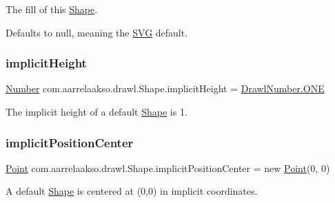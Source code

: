 The fill of this \hyperlink{classcom_1_1aarrelaakso_1_1drawl_1_1_shape}{Shape}. 

Defaults to null, meaning the \hyperlink{classcom_1_1aarrelaakso_1_1drawl_1_1_s_v_g}{S\+VG} default. \mbox{\label{classcom_1_1aarrelaakso_1_1drawl_1_1_shape_a9270317569c41e7f3f3fbe6e71df86e6}} 
\subsubsection{\texorpdfstring{implicit\+Height}{implicitHeight}}
{\footnotesize\ttfamily \hyperlink{interfacecom_1_1aarrelaakso_1_1drawl_1_1_number}{Number} com.\+aarrelaakso.\+drawl.\+Shape.\+implicit\+Height = \hyperlink{classcom_1_1aarrelaakso_1_1drawl_1_1_drawl_number_a0cd06e1d6344869ed300bc99afcde20a}{Drawl\+Number.\+O\+NE}\hspace{0.3cm}{\ttfamily [private]}}



The implicit height of a default \hyperlink{classcom_1_1aarrelaakso_1_1drawl_1_1_shape}{Shape} is 1. 

\mbox{\label{classcom_1_1aarrelaakso_1_1drawl_1_1_shape_af3b507f99acaa3b6b28f1e2e91409e1e}} 
\subsubsection{\texorpdfstring{implicit\+Position\+Center}{implicitPositionCenter}}
{\footnotesize\ttfamily \hyperlink{classcom_1_1aarrelaakso_1_1drawl_1_1_point}{Point} com.\+aarrelaakso.\+drawl.\+Shape.\+implicit\+Position\+Center = new \hyperlink{classcom_1_1aarrelaakso_1_1drawl_1_1_point}{Point}(0, 0)\hspace{0.3cm}{\ttfamily [private]}}



A default \hyperlink{classcom_1_1aarrelaakso_1_1drawl_1_1_shape}{Shape} is centered at (0,0) in implicit coordinates. 

